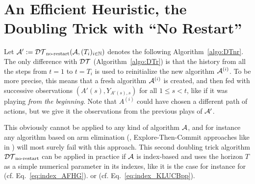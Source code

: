\documentclass[12pt]{colt2018} %
\begin{document}


\hr{}

\section{An Efficient Heuristic, the Doubling Trick with ``No Restart''}\label{sec:DTnr}



Let $\mathcal{A}' := \mathcal{DT}_{\text{no-restart}}(\mathcal{A}, (T_i)_{i\in\mathbb{N}})$ denotes the following Algorithm~\ref{algo:DTnr}.
The only difference with $\mathcal{DT}$ (Algorithm~\ref{algo:DTr}) is that the history from all the steps from $t=1$ to $t=T_i$ is used to reinitialize the new algorithm $\mathcal{A}^{(i)}$.
To be more precise, this means that a fresh algorithm $\mathcal{A}^{(i)}$ is created, and then fed with successive observations $(A'(s), Y_{A'(s), s})$ for all $1 \leq s < t$, like if it was playing \emph{from the beginning}.
Note that $A^{(i)}$ could have chosen a different path of actions, but we give it the observations from the previous plays of $\mathcal{A}'$.

This obviously cannot be applied to any kind of algorithm $\mathcal{A}$, and for instance any algorithm based on arm elimination (\eg, Explore-Then-Commit approaches like in \cite{Garivier2016ETC}) will most surely fail with this approach.
%
This second doubling trick algorithm $\mathcal{DT}_{\text{no-restart}}$ can be applied in practice if $\mathcal{A}$ is index-based and uses the horizon $T$ as a simple numerical parameter in its indexes,
like it is the case for instance for
\AFHG{} (cf. Eq.~\eqref{eq:index_AFHG}).
or \KLUCBpp{} (cf. Eq.~\eqref{eq:index_KLUCBpp}).
\end{document}
